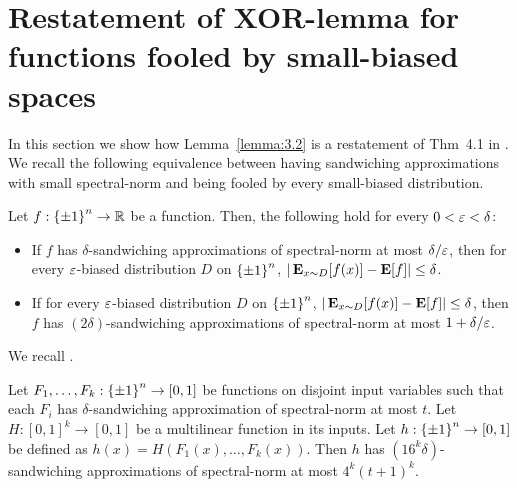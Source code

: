 
\section{Restatement of XOR-lemma for functions fooled by small-biased spaces}
\label{app:GMRTV}
In this section we show how Lemma~\ref{lemma:3.2} is a restatement of Thm~4.1 in \cite{GopalanMRTV12}. We recall the following equivalence between having sandwiching approximations with small spectral-norm and being fooled by every small-biased distribution.
\begin{lemma}\label{lem:DETT}
Let $f: {\{\pm1\}}^n \to {\mathbb{R}}$ be a function. Then, the following hold for every $0 < \varepsilon < \delta$:
\begin{itemize}
	\item If $f$ has $\delta$-sandwiching approximations of spectral-norm at most $\delta/\varepsilon$, then for every $\varepsilon$-biased distribution $D$ on ${\{\pm1\}}^n$, $|\mathop{\bf E\/}_{x\sim D}[f(x)] - \mathop{\bf E\/}[f]| \le \delta$.
	\item If for every $\varepsilon$-biased distribution $D$ on ${\{\pm1\}}^n$, $|\mathop{\bf E\/}_{x\sim D}[f(x)] - \mathop{\bf E\/}[f]| \le \delta$, then $f$ has $(2\delta)$-sandwiching approximations of spectral-norm at most $1+\delta/\varepsilon$.
\end{itemize}
\end{lemma}
We recall \cite[Thm.~4.1]{GopalanMRTV12}.
\begin{theorem}\label{thm:GMRTV:4.1}
 	Let $F_1, \ldots, F_k : {\{\pm1\}}^n \to [0,1]$ be functions on disjoint input variables such that each $F_i$ has $\delta$-sandwiching approximation of spectral-norm at most $t$.
 	Let $H:[0,1]^k \to [0,1]$ be a multilinear function in its inputs.
 	Let $h: {\{\pm1\}}^n \to [0,1]$ be defined as $h(x) = H(F_1(x), \ldots, F_k(x))$. Then $h$ has $(16^k\delta)$-sandwiching approximations of spectral-norm at most $4^k(t+1)^k$. 	
\end{theorem}

